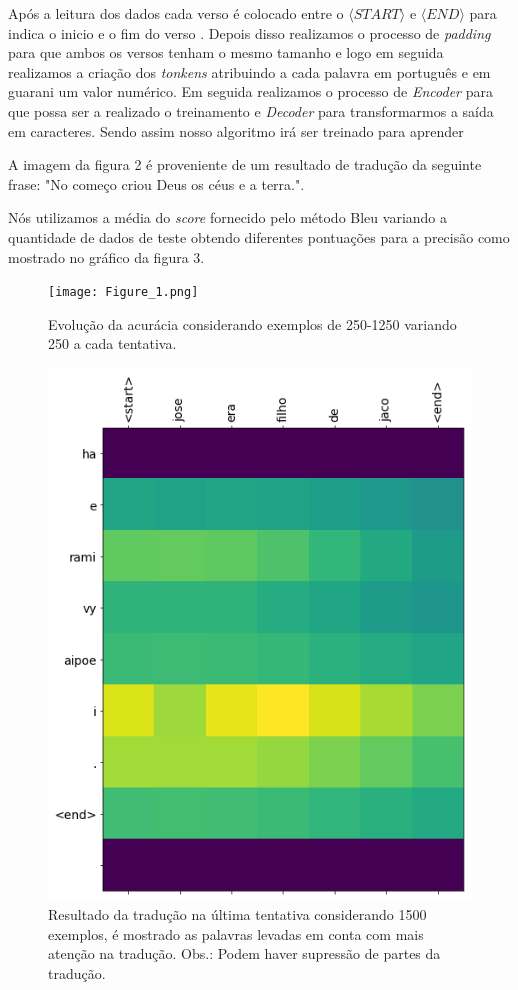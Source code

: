 \documentclass[12pt]{article}
\begin{document}
Após a leitura dos dados cada verso é colocado entre o $\langle\textit{START}\rangle$ e $\langle\textit{END}\rangle$ para indica o inicio e o fim do verso \cite{tensorflow}. Depois disso realizamos o processo de \textit{padding} para que ambos os versos tenham o mesmo tamanho e logo em seguida realizamos a criação dos \textit{tonkens} atribuindo a cada palavra em português e em guarani um valor numérico. Em seguida realizamos o processo de \textit{Encoder} para que possa ser a realizado o treinamento e \textit{Decoder} para transformarmos a saída em caracteres. Sendo assim nosso algoritmo irá ser treinado para aprender 

A imagem da figura 2 é proveniente de um resultado
de tradução da seguinte frase:
"No começo criou Deus os céus e a terra.".

Nós utilizamos a média do \textit{score} fornecido pelo método Bleu variando a quantidade de dados de teste obtendo diferentes pontuações para a precisão como mostrado no gráfico da figura 3.


\begin{figure}[h!]
\texttt{[image: Figure\_1.png]}
\caption{Evolução da acurácia considerando exemplos de 250-1250 variando 250 a cada tentativa. }
\label{fig:figure1}
\end{figure}

\begin{figure}[h!]
\centering
\includegraphics[width=.8\textwidth]{graph.png}
\caption{Resultado da tradução na última tentativa considerando 1500 exemplos, é mostrado as palavras levadas em conta com mais atenção na tradução. Obs.: Podem haver supressão de partes da tradução.}
\label{fig:exampleFig1}
\end{figure}
\end{document}
